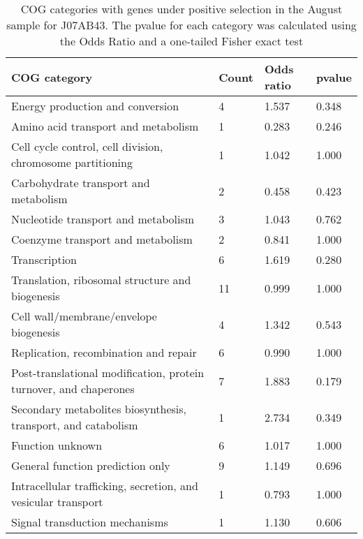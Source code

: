 \begin{table}[hb]
\footnotesize 
	\tabcolsep=0.11cm 
\caption{COG categories with genes under positive selection in the August sample for J07AB43. The pvalue for each category was calculated using the Odds Ratio and a one-tailed Fisher exact test \\} 
\begin{tabularx}{\textwidth}{L{6cm}R{2cm}R{2cm}R{2cm}} 
\hline 
\textbf{COG category} & \textbf{Count} & \textbf{Odds ratio} & \textbf{pvalue} \\ 
\hline 
Energy production and conversion & 4 & 1.537 & 0.348 \\ 
Amino acid transport and metabolism & 1 & 0.283 & 0.246 \\ 
Cell cycle control, cell division, chromosome partitioning & 1 & 1.042 & 1.000 \\ 
Carbohydrate transport and metabolism & 2 & 0.458 & 0.423 \\ 
Nucleotide transport and metabolism & 3 & 1.043 & 0.762 \\ 
Coenzyme transport and metabolism & 2 & 0.841 & 1.000 \\ 
Transcription & 6 & 1.619 & 0.280 \\ 
Translation, ribosomal structure and biogenesis & 11 & 0.999 & 1.000 \\ 
Cell wall/membrane/envelope biogenesis & 4 & 1.342 & 0.543 \\ 
Replication, recombination and repair & 6 & 0.990 & 1.000 \\ 
Post-translational modification, protein turnover, and chaperones & 7 & 1.883 & 0.179 \\ 
Secondary metabolites biosynthesis, transport, and catabolism & 1 & 2.734 & 0.349 \\ 
Function unknown & 6 & 1.017 & 1.000 \\ 
General function prediction only & 9 & 1.149 & 0.696 \\ 
Intracellular trafficking, secretion, and vesicular transport & 1 & 0.793 & 1.000 \\ 
Signal transduction mechanisms & 1 & 1.130 & 0.606 \\ 
\end{tabularx} 
\label{August_COG_Selection_J07AB43} 
 \end{table} 


